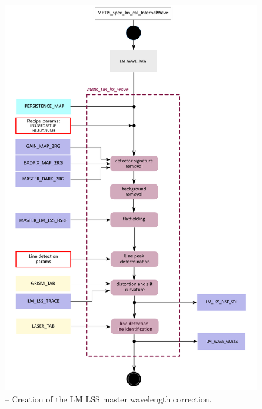 \begin{figure}[ht]
  \centering
  \includegraphics[width=0.5\textheight]{figures/metis_lm_lss_wave_v0.71.pdf}
  \caption[Recipe: ]{ --
    Creation of the LM LSS master wavelength correction.}
  \label{Fig:rec_lm_lss_trace}
\end{figure}
\clearpage

